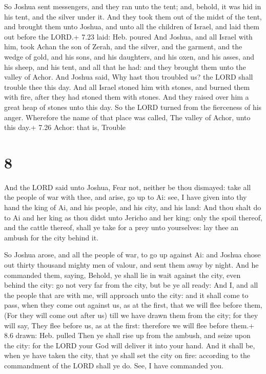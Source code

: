  So Joshua sent messengers, and they ran unto the tent;
and, behold, it was hid in his tent, and the silver under it.
 And they took them out of the midst of the tent, and
brought them unto Joshua, and unto all the children of Israel, and laid
them out before the LORD.+ 7.23 laid: Heb. poured  And
Joshua, and all Israel with him, took Achan the son of Zerah, and the
silver, and the garment, and the wedge of gold, and his sons, and his
daughters, and his oxen, and his asses, and his sheep, and his tent, and
all that he had: and they brought them unto the valley of Achor.
 And Joshua said, Why hast thou troubled us? the LORD shall
trouble thee this day. And all Israel stoned him with stones, and burned
them with fire, after they had stoned them with stones. 
And they raised over him a great heap of stones unto this day. So the
LORD turned from the fierceness of his anger. Wherefore the name of that
place was called, The valley of Achor, unto this day.+ 7.26 Achor: that
is, Trouble

\hypertarget{section-7}{%
\section{8}\label{section-7}}

 And the LORD said unto Joshua, Fear not, neither be thou
dismayed: take all the people of war with thee, and arise, go up to Ai:
see, I have given into thy hand the king of Ai, and his people, and his
city, and his land:  And thou shalt do to Ai and her king as
thou didst unto Jericho and her king: only the spoil thereof, and the
cattle thereof, shall ye take for a prey unto yourselves: lay thee an
ambush for the city behind it.

 So Joshua arose, and all the people of war, to go up
against Ai: and Joshua chose out thirty thousand mighty men of valour,
and sent them away by night.  And he commanded them, saying,
Behold, ye shall lie in wait against the city, even behind the city: go
not very far from the city, but be ye all ready:  And I, and
all the people that are with me, will approach unto the city: and it
shall come to pass, when they come out against us, as at the first, that
we will flee before them,  (For they will come out after us)
till we have drawn them from the city; for they will say, They flee
before us, as at the first: therefore we will flee before them.+ 8.6
drawn: Heb. pulled  Then ye shall rise up from the ambush,
and seize upon the city: for the LORD your God will deliver it into your
hand.  And it shall be, when ye have taken the city, that ye
shall set the city on fire: according to the commandment of the LORD
shall ye do. See, I have commanded you.

